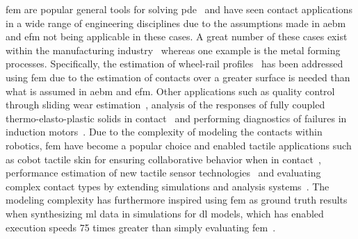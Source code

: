 \gls{fem} are popular general tools for solving \gls{pde}~\cite{history-of-finite-element-method:-a-review} and have seen contact applications in a wide range of engineering disciplines due to the assumptions made in \gls{aebm} and \gls{efm} not being applicable in these cases. A great number of these cases exist within the manufacturing industry~\cite{examples-of-fem-application-in-manufacturing-technology} whereas one example is the metal forming processes. Specifically, the estimation of wheel-rail profiles~\cite{contact-mechanics-analysis-of-measured-wheel-rail-profiles-using-the-finite-element-method} has been addressed using \gls{fem} due to the estimation of contacts over a greater surface is needed than what is assumed in \gls{aebm} and \gls{efm}. Other applications such as quality control through sliding wear estimation~\cite{simulating-sliding-wear-with-finite-element-method}, analysis of the responses of fully coupled thermo-elasto-plastic solids in contact~\cite{a-finite-element-procedure-for-the-analysis-of-thermo-mechanical-solids-in-contact} and performing diagnostics of failures in induction motors~\cite{induction-motors-fault-diagnosis-using-finite-element-method:-a-review}. Due to the complexity of modeling the contacts within robotics, \gls{fem} have become a popular choice and enabled tactile applications such as \gls{cobot} tactile skin for ensuring collaborative behavior when in contact~\cite{soft-robot-skin-with-conformal-adaptability-for-on-body-tactile-perception-of-collaborative-robots}, performance estimation of new tactile sensor technologies~\cite{design-and-experimental-research-of-robot-finger-sliding-tactile-sensor-based-on-fbg} and evaluating complex contact types by extending simulations and analysis systems~\cite{grasp-analysis-using-deformable-fingers}.
The modeling complexity has furthermore inspired using \gls{fem} as ground truth results when synthesizing \gls{ml} data in simulations for \gls{dl} models, which has enabled execution speeds \num{75} times greater than simply evaluating \gls{fem}~\cite{sim-to-real-for-robotic-tactile-sensing-via-physics-based-simulation-and-learned-latent-projections, interpreting-and-predicting-tactile-signals-via-a-physics-based-and-data-driven-framework, ground-truth-force-distribution-for-learning-based-tactile-sensing:-a-finite-element-approach}. \medskip


